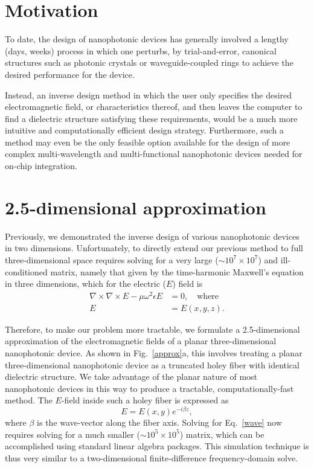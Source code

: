\documentclass[10pt,letterpaper]{article}
\begin{document}
\section{Motivation}
To date, the design of nanophotonic devices has generally involved a lengthy (days, weeks) process in which one perturbs, by trial-and-error, canonical structures such as photonic crystals or waveguide-coupled rings to achieve the desired performance for the device. 

Instead, an inverse design method in which the user only specifies the desired electromagnetic field, or characteristics thereof, and then leaves the computer to find a dielectric structure satisfying these requirements, would be a much more intuitive and computationally efficient design strategy. Furthermore, such a method may even be the only feasible option available for the design of more complex multi-wavelength and multi-functional nanophotonic devices needed for on-chip integration\cite{miller}.

\section{2.5-dimensional approximation}
Previously, we demonstrated the inverse design of various nanophotonic devices in two dimensions\cite{prevwork}.
Unfortunately, to directly extend our previous method to full three-dimensional space requires solving for a very large ($\sim 10^7 \times 10^7$) and ill-conditioned matrix, namely that given by the time-harmonic Maxwell's equation in three dimensions, which for the electric ($E$) field is
\begin{align}
\nabla\times\nabla\times E - \mu\omega^2\epsilon E &= 0,\quad\text{where}\label{wave} \\
E &= E(x,y,z).
\end{align}

Therefore, to make our problem more tractable, we formulate a 2.5-dimensional approximation of the electromagnetic fields of a planar three-dimensional nanophotonic device. As shown in Fig.~\ref{approx}a, this involves treating a planar three-dimensional nanophotonic device as a truncated holey fiber with identical dielectric structure. We take advantage of the planar nature of most nanophotonic devices in this way to produce a tractable, computationally-fast method. The $E$-field inside such a holey fiber is expressed as
\begin{equation}
E = E(x,y)e^{-i\beta z},
\end{equation}
where $\beta$ is the wave-vector along the fiber axis. Solving for Eq.~\ref{wave} now requires solving for a much smaller ($\sim 10^5 \times 10^5$) matrix, which can be accomplished using standard linear algebra packages. This simulation technique is thus very similar to a two-dimensional finite-difference frequency-domain solve.
\end{document}

